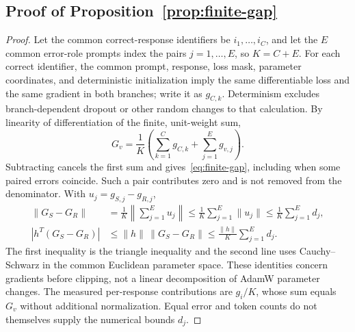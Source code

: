 \subsection{Proof of Proposition~\ref{prop:finite-gap}}
\begin{proof}
Let the common correct-response identifiers be $i_1,\ldots,i_C$, and let
the $E$ common error-role prompts index the pairs $j=1,\ldots,E$, so
$K=C+E$. For each correct identifier, the common prompt, response, loss
mask, parameter coordinates, and deterministic initialization imply the
same differentiable loss and the same gradient in both branches; write
it as $g_{C,k}$. Determinism excludes branch-dependent dropout or other
random changes to that calculation. By linearity of differentiation
of the finite, unit-weight sum,
\[
 G_v=\frac1K\left(\sum_{k=1}^C g_{C,k}+\sum_{j=1}^E g_{v,j}\right).
\]
Subtracting cancels the first sum and gives~\eqref{eq:finite-gap}, including
when some paired errors coincide. Such a pair contributes zero and is
not removed from the denominator. With $u_j=g_{S,j}-g_{R,j}$,
\begin{align*}
 \|G_S-G_R\|
 &=\frac1K\left\|\sum_{j=1}^E u_j\right\|
 \leq\frac1K\sum_{j=1}^E\|u_j\|
 \leq\frac1K\sum_{j=1}^E d_j,\\
 |h^T(G_S-G_R)|
 &\leq\|h\|\,\|G_S-G_R\|
 \leq\frac{\|h\|}{K}\sum_{j=1}^E d_j.
\end{align*}
The first inequality is the triangle inequality and the second line uses
Cauchy--Schwarz in the common Euclidean parameter space. These identities
concern gradients before clipping, not a linear decomposition of AdamW
parameter changes. The measured per-response contributions are $g_i/K$,
whose sum equals $G_v$ without additional normalization. Equal error and token counts
do not themselves supply the numerical bounds $d_j$.
\end{proof}

